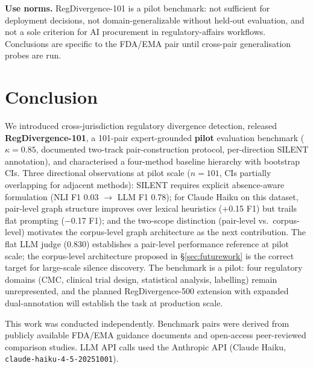 \documentclass[manuscript]{acmart}
\begin{document}
\textbf{Use norms.} RegDivergence-101 is a pilot benchmark: not sufficient for
deployment decisions, not domain-generalizable without held-out evaluation, and
not a sole criterion for AI procurement in regulatory-affairs workflows.
Conclusions are specific to the FDA/EMA pair until cross-pair generalisation
probes are run.

\section{Conclusion}

We introduced cross-jurisdiction regulatory divergence detection, released
\textbf{RegDivergence-101}, a 101-pair expert-grounded \textbf{pilot}
evaluation benchmark ($\kappa = 0.85$, documented two-track pair-construction
protocol, per-direction SILENT annotation), and characterised a four-method
baseline hierarchy with bootstrap CIs. Three directional observations at pilot
scale ($n = 101$, CIs partially overlapping for adjacent methods): SILENT
requires explicit absence-aware formulation (NLI F1 0.03 $\to$ LLM F1 0.78);
for Claude Haiku on this dataset, pair-level graph structure improves over
lexical heuristics (+0.15 F1) but trails flat prompting ($-$0.17 F1); and
the two-scope distinction (pair-level vs.\ corpus-level) motivates the
corpus-level graph architecture as the next contribution. The flat LLM judge
(0.830) establishes a pair-level performance reference at pilot scale; the
corpus-level architecture proposed in \S\ref{sec:futurework} is the correct
target for large-scale silence discovery. The benchmark is a pilot: four regulatory domains (CMC,
clinical trial design, statistical analysis, labelling) remain unrepresented,
and the planned RegDivergence-500 extension with expanded dual-annotation will
establish the task at production scale.

\begin{acks}
This work was conducted independently. Benchmark pairs were derived from
publicly available FDA/EMA guidance documents and open-access peer-reviewed
comparison studies. LLM API calls used the Anthropic API (Claude Haiku,
\texttt{claude-haiku-4-5-20251001}).
\end{acks}



\end{document}
